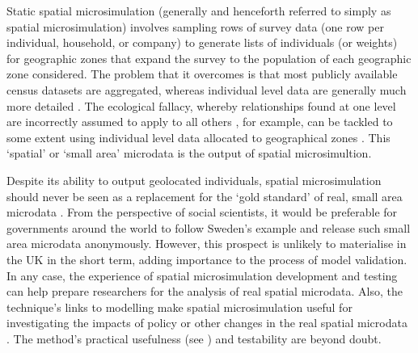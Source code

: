 \documentclass[a4paper, 11pt, twoside]{Thesis}
\begin{document}
Static spatial microsimulation (generally and henceforth referred to simply as
spatial microsimulation) involves sampling rows of
survey data (one row per individual, household, or company) to generate lists of
individuals (or weights) for geographic zones that expand the survey to the
population of each geographic zone considered. The
problem that it overcomes is that most publicly available
census datasets are aggregated, whereas individual level data are generally
much more detailed \citep{ballas2003microsimulation-30-years}.
The ecological fallacy, whereby relationships found at one level are 
incorrectly assumed to apply to all others \citep{Openshaw1983}, for example, can be tackled
to some extent using individual level data allocated to geographical zones
\citep{Hermes2012a}. This `spatial' or `small area' microdata is the output
of spatial microsimultion.

Despite its ability to output geolocated individuals,
spatial microsimulation should never be seen as a
replacement for the `gold standard' of real,
small area microdata \citep[p.~4]{Martin2002}. From the perspective of social
scientists, it would be preferable for governments around the world to follow
Sweden's example and release such small area microdata anonymously. However, this
prospect is unlikely to materialise in the UK in the short term,
adding importance to the process
of model validation. In any case, the experience of spatial microsimulation
development and testing can help prepare researchers for the analysis of real
spatial microdata. Also, the technique's links to modelling make spatial
microsimulation useful for investigating the impacts of policy or other
changes in the real spatial microdata \citep{Holm1987}.
The method's practical usefulness (see \citealp{Tomintz2008})
and testability \citep{Edwards2009} are beyond doubt.
\end{document}
